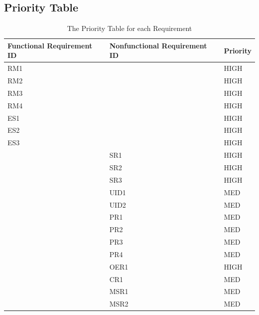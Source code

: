 \documentclass[12pt]{article}
\begin{document}
\subsection{Priority Table}
\begin{table}[H]
    \begin{tabular}{|p{}|p{}|p{}|}
        \hline Functional Requirement ID & Nonfunctional Requirement ID & Priority \\
        \hline RM1                       &                              & HIGH     \\
        \hline RM2                       &                              & HIGH     \\
        \hline RM3                       &                              & HIGH     \\
        \hline RM4                       &                              & HIGH     \\
        \hline ES1                       &                              & HIGH     \\
        \hline ES2                       &                              & HIGH     \\
        \hline ES3                       &                              & HIGH     \\
        \hline                           & SR1                          & HIGH     \\
        \hline                           & SR2                          & HIGH     \\
        \hline                           & SR3                          & HIGH     \\
        \hline                           & UID1                         & MED      \\
        \hline                           & UID2                         & MED      \\
        \hline                           & PR1                          & MED      \\
        \hline                           & PR2                          & MED      \\
        \hline                           & PR3                          & MED      \\
        \hline                           & PR4                          & MED      \\
        \hline                           & OER1                         & HIGH     \\
        \hline                           & CR1                          & MED      \\
        \hline                           & MSR1                         & MED      \\
        \hline                           & MSR2                         & MED      \\
        \hline
    \end{tabular}
    \caption{The Priority Table for each Requirement}
\end{table}
\end{document}
